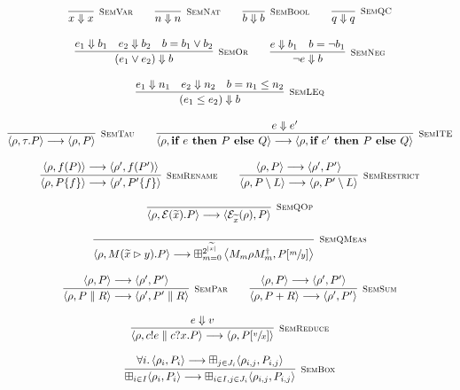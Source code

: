   \begin{gather*}
    \infer[\mbox{\footnotesize\scshape SemVar}]{x \Downarrow x}{} \qquad
    \infer[\mbox{\footnotesize\scshape SemNat}]{n \Downarrow n}{} \qquad
    \infer[\mbox{\footnotesize\scshape SemBool}]{b \Downarrow b}{}  \qquad
    \infer[\mbox{\footnotesize\scshape SemQC}]{q \Downarrow q}{} \\[0.3cm]
    \infer[\mbox{\footnotesize\scshape SemOr}]{(e_1 \lor e_2) \Downarrow b}{e_1 \Downarrow b_1 & e_2 \Downarrow b_2 & b = b_1 \lor b_2} \qquad
    \infer[\mbox{\footnotesize\scshape SemNeg}]{\neg e \Downarrow b}{e \Downarrow b_1 & b = \neg b_1} \\[0.3cm]
    \infer[\mbox{\footnotesize\scshape SemLEq}]{(e_1 \leq e_2) \Downarrow b}{e_1 \Downarrow n_1 & e_2 \Downarrow n_2 & b = n_1 \leq n_2} \\[0.3cm]
    \infer[\mbox{\footnotesize\scshape SemTau}]{\langle \rho, \tau . P \rangle \longrightarrow \langle \rho, P \rangle}{} \qquad
    \infer[\mbox{\footnotesize\scshape SemITE}]{\langle \rho, \ite{e}{P}{Q} \rangle \longrightarrow \langle \rho, \ite{e'}{P}{Q} \rangle}{e \Downarrow e'} \\[0.3cm]
    \infer[\mbox{\footnotesize\scshape SemRename}]{\langle \rho, P \{f\} \rangle \longrightarrow \langle \rho', P' \{f\}\rangle}{\langle \rho, f(P) \rangle \longrightarrow \langle \rho', f(P') \rangle} \qquad
    \infer[\mbox{\footnotesize\scshape SemRestrict}]{\langle \rho, P \setminus L \rangle \longrightarrow \langle \rho, P' \setminus L \rangle}{\langle \rho, P \rangle \longrightarrow \langle \rho', P' \rangle} \\[0.3cm]
    \infer[\mbox{\footnotesize\scshape SemQOp}]{\langle \rho, \mathcal{E}(\widetilde{x}) . P \rangle \longrightarrow \langle \mathcal{E}_{\widetilde{x}}(\rho), P \rangle}{} \\[0.3cm]
    \infer[\mbox{\footnotesize\scshape SemQMeas}]{\langle \rho, M(\widetilde{x} \rhd y) . P \rangle \longrightarrow \boxplus_{m = 0}^{2^{|\widetilde{x}|}} \left\langle {M_m \rho M_m^\dag}, P[\sfrac{m}{y}] \right\rangle}{} \\[0.3cm]
    \infer[\mbox{\footnotesize\scshape SemPar}]{\langle \rho, P \parallel R \rangle \longrightarrow \langle \rho', P' \parallel R \rangle}{\langle \rho, P \rangle \longrightarrow \langle \rho', P' \rangle} \qquad
    \infer[\mbox{\footnotesize\scshape SemSum}]{\langle \rho, P + R \rangle \longrightarrow \langle \rho', P' \rangle}{\langle \rho, P \rangle \longrightarrow \langle \rho', P' \rangle} \\[0.3cm]
    \infer[\mbox{\footnotesize\scshape SemReduce}]{\langle \rho, c!e \parallel c?x . P \rangle \longrightarrow \langle \rho, P[\sfrac{v}{x}] \rangle}{e \Downarrow v} \\[0.3cm]
    \infer[\mbox{\footnotesize\scshape SemBox}]{\boxplus_{i \in I}\langle \rho_i, P_i \rangle \longrightarrow \boxplus_{i \in I, j \in J_i}\langle \rho_{i, j},P_{i, j} \rangle}
          {\forall i \ldotp \langle \rho_i, P_i \rangle \longrightarrow \boxplus_{j \in J_i} \langle\rho_{i, j},P_{i, j}\rangle}
  \end{gather*}
  
